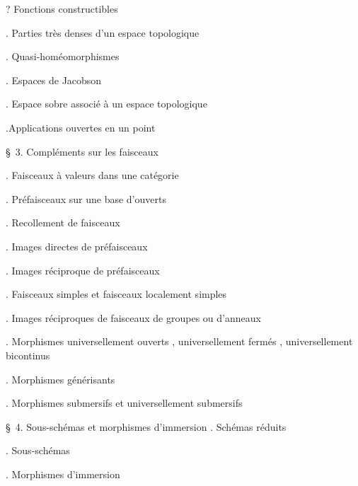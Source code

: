 \noindent{}? Fonctions constructibles\dotfill

\noindent{}. Parties très denses d'un espace topologique\dotfill

\noindent{}. Quasi-homéomorphismes\dotfill

\noindent{}. Espaces de Jacobson\dotfill

\noindent{}. Espace sobre associé à un espace topologique\dotfill

\noindent{}.Applications ouvertes en un point \dotfill

\noindent\quad \S\ 3. Compléments sur les faisceaux\dotfill

\noindent{}. Faisceaux à valeurs dans une catégorie\dotfill

\noindent{}. Préfaisceaux sur une base d'ouverts\dotfill

\noindent{}. Recollement de faisceaux\dotfill

\noindent{}. Images directes de préfaisceaux\dotfill

\noindent{}. Images réciproque de préfaisceaux\dotfill

\noindent{}. Faisceaux simples et faisceaux localement simples\dotfill

\noindent{}. Images réciproques de faisceaux de groupes ou d'anneaux\dotfill

\clearpage
{}

\noindent{}. Morphismes universellement ouverts , universellement fermés , universellement bicontinus\dotfill

\noindent{}. Morphismes générisants\dotfill

\noindent{}. Morphismes submersifs et universellement submersifs

\noindent\quad \S\ 4. Sous-schémas et morphismes d'immersion . Schémas réduits\dotfill

\noindent{}. Sous-schémas\dotfill

\noindent{}. Morphismes d'immersion\dotfill

